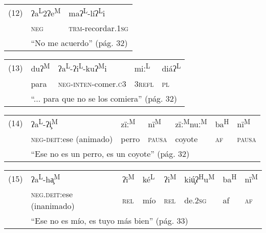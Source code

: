 {\setmainfont{Doulos SIL}
    \begin{tabular}{lll}
        (12) & ʔa\textsuperscript{L}2ʔe\textsuperscript{M}     & maʔ\textsuperscript{L}-líʔ\textsuperscript{L}i \\
             & \textsc{neg}                                    & \textsc{trm}-recordar.\textsc{1sg}              \\
             & \multicolumn{2}{l}{``No me acuerdo'' (pág. 32)}
    \end{tabular} \vspace{0.5cm}

    \begin{tabular}{lllll}
        (13) & duʔ\textsuperscript{M}                                           & ʔa\textsuperscript{L}-ʔi\textsuperscript{L}-kuʔ\textsuperscript{M}i & miː\textsuperscript{L} & diáʔ\textsuperscript{L} \\
             & para                                                             & \textsc{neg}-\textsc{inten}-comer.\textsc{c}3                       & 3\textsc{refl}         & \textsc{pl}             \\
             & \multicolumn{4}{l}{``... para que no se los comiera'' (pág. 32)}
    \end{tabular} \vspace{0.5cm}

    \begin{tabular}{lllllll}
        (14) & ʔa\textsuperscript{L}-ʔi̧\textsuperscript{M} & zïː\textsuperscript{M} & nï\textsuperscript{M} & zïː\textsuperscript{M}nuː\textsuperscript{M} & ba\textsuperscript{H} & nï\textsuperscript{M} \\
        & \textsc{neg-deit}:ese (animado) & perro & \textsc{pausa} & coyote & \textsc{af} & \textsc{pausa} \\
        & \multicolumn{6}{l}{``Ese no es un perro, es un coyote'' (pág. 32)}
    \end{tabular} \vspace*{0.5cm}
        
\begin{tabular}{llllllll}
	(15) & ʔa\textsuperscript{L}-ha̧\textsuperscript{M}	& ʔi\textsuperscript{M} & ké\textsuperscript{L} & ʔi\textsuperscript{M} & kiú̧ʔ\textsuperscript{H}u\textsuperscript{M} & ba\textsuperscript{H} & nï\textsuperscript{M} \\
	& \textsc{neg.deit}:ese (inanimado) & \textsc{rel} & mío & \textsc{rel} & de.\textsc{2sg} & af & \textsc{af} \\
	& \multicolumn{7}{l}{``Ese no es mío, es tuyo más bien'' (pág. 33)}	
\end{tabular} \vspace{1cm}
}

